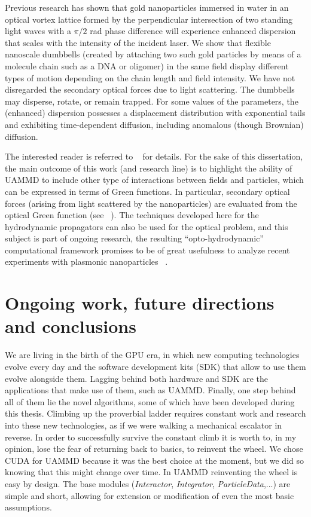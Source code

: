 \documentclass[twoside,openright,titlepage,numbers=noenddot,%
headinclude,footinclude,cleardoublepage=empty,abstract=on,
BCOR=5mm,fontsize=11pt, dvipsnames, paper=b5
]{scrreprt}
\begin{document}
Previous research has shown that gold nanoparticles immersed in water in an optical vortex lattice formed by the perpendicular intersection of two standing light waves with a $\pi/2$ rad phase difference will experience enhanced dispersion that scales with the intensity of the incident laser. We show that flexible nanoscale dumbbells (created by attaching two such gold particles by means of a molecule chain such as a DNA or oligomer) in the same field display different types of motion depending on the chain length and field intensity. We have not disregarded the secondary optical forces due to light scattering. The dumbbells may disperse, rotate, or remain trapped. For some values of the parameters, the (enhanced) dispersion possesses a displacement distribution with exponential tails and exhibiting time-dependent diffusion, including anomalous (though Brownian) diffusion.

The interested reader is referred to ~\cite{Melendez2019} for details. For the sake of this dissertation, the main outcome of this work (and research line) is to highlight the ability of UAMMD to include other type of interactions between fields and particles, which can be expressed in terms of Green functions. In particular, secondary optical forces (arising from light scattered by the nanoparticles) are evaluated from the optical Green function (see ~\cite{Buscalioni2018,Melendez2019}). The techniques developed here for the hydrodynamic propagators can also be used for the optical problem, and this subject is part of ongoing research, the resulting ``opto-hydrodynamic'' computational framework promises to be of great usefulness to analyze recent experiments with plasmonic nanoparticles ~\cite{Ye2020}.






\chapter{Ongoing work, future directions and conclusions}\label{ch:conclusions}
We are living in the birth of the GPU era, in which new computing technologies evolve every day and the software development kits (SDK) that allow to use them evolve alongside them. Lagging behind both hardware and SDK are the applications that make use of them, such as UAMMD. Finally, one step behind all of them lie the novel algorithms, some of which have been developed during this thesis. Climbing up the proverbial ladder requires constant work and research into these new technologies, as if we were walking a mechanical escalator in reverse. In order to successfully survive the constant climb it is worth to, in my opinion, lose the fear of returning back to basics, to reinvent the wheel. We chose CUDA for UAMMD because it was the best choice at the moment, but we did so knowing that this might change over time. In UAMMD reinventing the wheel is easy by design. The base modules (\emph{Interactor}, \emph{Integrator}, \emph{ParticleData},...) are simple and short, allowing for extension or modification of even the most basic assumptions. 
\end{document}
